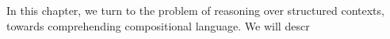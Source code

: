 In this chapter, we turn to the problem of reasoning over structured contexts, towards comprehending compositional language. We will descr